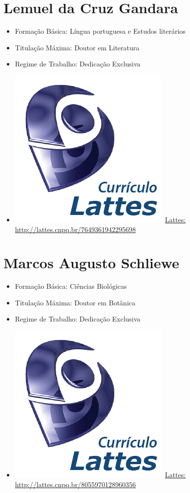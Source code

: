 \documentclass[11pt,fleqn]{book} %
\begin{document}
\section{Lemuel da Cruz Gandara}\label{LemuelGandara}
\begin{itemize}
	\item Formação Básica: Língua portuguesa e Estudos literários
	\item Titulação Máxima: Doutor em Literatura
	\item Regime de Trabalho: Dedicação Exclusiva
	\item \includegraphics[scale=.03]{Pictures/lattes}~\href{http://lattes.cnpq.br/7649361942295698}{Lattes: http://lattes.cnpq.br/7649361942295698}
\end{itemize}

\section{Marcos Augusto Schliewe}\label{MarcosSchliewe}
\begin{itemize}
	\item Formação Básica: Ciências Biológicas
	\item Titulação Máxima: Doutor em Botânica
	\item Regime de Trabalho: Dedicação Exclusiva
	\item \includegraphics[scale=.03]{Pictures/lattes}~\href{http://lattes.cnpq.br/8055970128960356}{Lattes: http://lattes.cnpq.br/8055970128960356}
\end{itemize}
\end{document}
